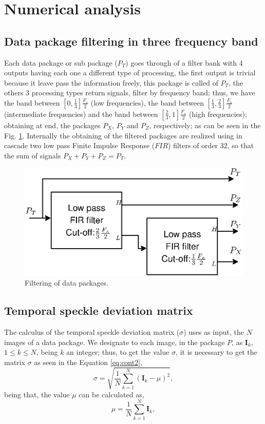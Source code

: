 \documentclass[review]{elsarticle}
\begin{document}
\section{Numerical analysis}
\label{sec:analysis}

\subsection{Data package filtering in three frequency band}
\label{subsec:firfilters}
Each data package or sub package ($P_T$) goes through of a filter bank with 4 outputs  having each
one a different type of processing, the first output is trivial because it
leave pass the information freely, this package is called of $P_T$, the others 3 processing types
return  signals, filter by frequency band; thus, 
we have the band between $[0,\frac{1}{3}]\frac{F_s}{2}$ (low frequencies),
the band between $[\frac{1}{3},\frac{2}{3}]\frac{F_s}{2}$ (intermediate frequencies) and
the band between $[\frac{2}{3},1]\frac{F_s}{2}$ (high frequencies); obtaining at end, the packages 
$P_X$, $P_Y$ and $P_Z$, respectively; as can be seen in the  Fig. \ref{fig:firfilters}.
Internally the obtaining of the filtered packages are realized using in cascade
two low pass Finite Impulse Response ($FIR$) filters of order $32$, so that
the sum of signals $P_X+P_Y+P_Z=P_T$.
\begin{figure}[h!]
\centering
\includegraphics[width=0.55\columnwidth]{firfilters.eps}
\caption{Filtering of data packages.}
\label{fig:firfilters}
\end{figure}



\subsection{Temporal speckle deviation matrix}
\label{subsec:deviation}
The calculus of the temporal speckle deviation matrix ($\sigma$) \cite{Nothdurft:05} 
uses as input, the $N$ images of a data package.
We designate to each image, in the package $P$, as $\mathbf{I}_{k}$, $1\leq k \leq N$, being $k$ an integer;
thus, to get the value $\sigma$, 
 it is necessary to get 
the matrix $\sigma$ as seen in the Equation \ref{eq:cont2}, 
\begin{equation}\label{eq:cont2}
\sigma  = \sqrt{ \frac{1}{N} \sum_{k=1}^{N} (\mathbf{I}_{k}-\mu)^2  },
\end{equation}
being that, the value $\mu$ can be calculated as, 
\begin{equation}\label{eq:cont1}
\mu =  \frac{1}{N} \sum_{k=1}^{N} \mathbf{I}_{k},
\end{equation}
\end{document}
